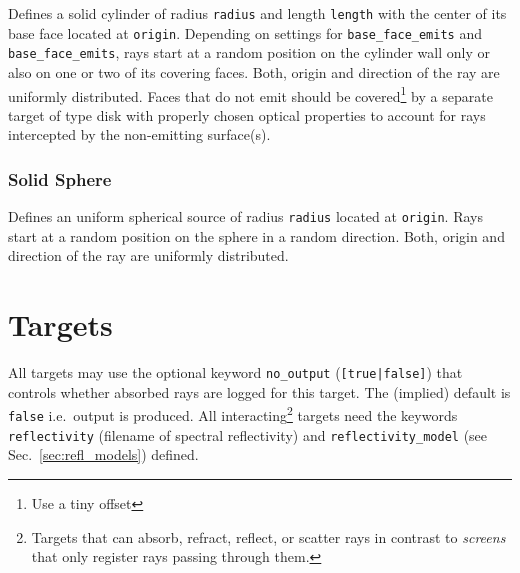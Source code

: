 \documentclass[10pt,a4paper,titlepage]{article}
\begin{document}






\vspace{0.25cm}
Defines a solid cylinder of radius {\tt radius} and length {\tt length} with the center of its base face located at {\tt origin}. Depending on settings for {\tt base\_face\_emits} and {\tt base\_face\_emits}, rays start at a random position on the cylinder wall only or also on one or two of its covering faces. Both, origin and direction of the ray are uniformly distributed. Faces that do not emit should be covered\footnote{Use a tiny offset} by a separate target of type disk with properly chosen optical properties to account for rays intercepted by the non-emitting surface(s).

\subsubsection{Solid Sphere}








\vspace{0.25cm}
Defines an uniform spherical source of radius {\tt radius} located at {\tt origin}. Rays start at a random position on the sphere in a random direction. Both, origin and direction of the ray are uniformly distributed.




\section{Targets}
All targets may use the optional keyword {\tt no\_output} ({\tt [true|false]}) that controls whether absorbed rays are logged for this target. The (implied) default is {\tt false} i.e.\ output is produced. All interacting\footnote{Targets that can absorb, refract, reflect, or scatter rays in contrast to {\it screens} that only register rays passing through them.} targets need the keywords {\tt reflectivity} (filename of spectral reflectivity) and {\tt reflectivity\_model} (see Sec.~\ref{sec:refl_models}) defined.
\end{document}
